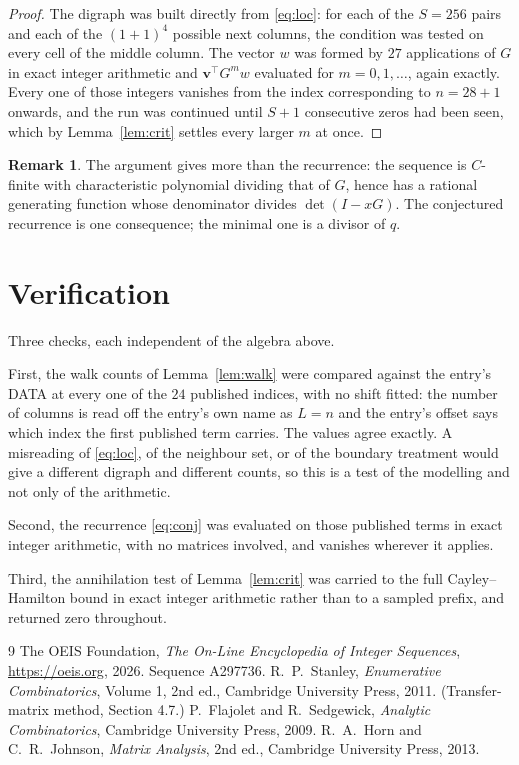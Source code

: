 \documentclass[11pt,a4paper]{article}
\theoremstyle{plain}
\theoremstyle{definition}
\newtheorem{remark}[theorem]{Remark}
\begin{document}
\begin{proof}
The digraph was built directly from \eqref{eq:loc}: for each of the $S=256$ pairs and each
of the $(1+1)^{4}$ possible next columns, the condition was tested on every cell of
the middle column. The vector $w$ was formed by $27$ applications of $G$ in exact integer
arithmetic and $\mathbf{v}^{\!\top}G^{m}w$ evaluated for $m=0,1,\dots$, again exactly.
Every one of those integers vanishes from the index corresponding to $n=28+1$ onwards,
and the run was continued until $S+1$ consecutive zeros had been seen, which by
Lemma~\ref{lem:crit} settles every larger $m$ at once.
\end{proof}

\begin{remark}
The argument gives more than the recurrence: the sequence is $C$-finite with characteristic
polynomial dividing that of $G$, hence has a rational generating function whose denominator
divides $\det(I-xG)$. The conjectured recurrence is one consequence; the minimal one is a
divisor of $q$.
\end{remark}

\section{Verification}

Three checks, each independent of the algebra above.

First, the walk counts of Lemma~\ref{lem:walk} were compared against the entry's DATA at
every one of the $24$ published indices, with no shift fitted: the number of columns is
read off the entry's own name as $L=n$ and the entry's offset says which index the first
published term carries. The values agree exactly. A misreading of \eqref{eq:loc}, of the
neighbour set, or of the boundary treatment would give a different digraph and different
counts, so this is a test of the modelling and not only of the arithmetic.

Second, the recurrence \eqref{eq:conj} was evaluated on those published terms in exact
integer arithmetic, with no matrices involved, and vanishes wherever it applies.

Third, the annihilation test of Lemma~\ref{lem:crit} was carried to the full
Cayley--Hamilton bound in exact integer arithmetic rather than to a sampled prefix, and
returned zero throughout.

\begin{thebibliography}{9}
 The OEIS Foundation, \emph{The On-Line Encyclopedia of Integer
Sequences}, \url{https://oeis.org}, 2026. Sequence A297736.
 R.~P.~Stanley, \emph{Enumerative Combinatorics}, Volume 1, 2nd ed.,
Cambridge University Press, 2011. (Transfer-matrix method, Section 4.7.)
 P.~Flajolet and R.~Sedgewick, \emph{Analytic Combinatorics}, Cambridge
University Press, 2009.
 R.~A.~Horn and C.~R.~Johnson, \emph{Matrix Analysis}, 2nd ed., Cambridge
University Press, 2013.
\end{thebibliography}
\end{document}
